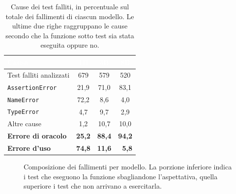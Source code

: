 \begin{table}[H]
\centering
\caption{Cause dei test falliti, in percentuale sul totale dei fallimenti di
ciascun modello. Le ultime due righe raggruppano le cause secondo che la
funzione sotto test sia stata eseguita oppure no.}
\label{tab:fallimenti}
\begin{tabular}{lccc}
\hline
\rowcolor{intest}
\textcolor{white}{\textbf{Causa}} & \textcolor{white}{\textbf{1B}} &
\textcolor{white}{\textbf{3B}} & \textcolor{white}{\textbf{8B}} \\
\hline
Test falliti analizzati & 679 & 579 & 520 \\
\hline
\texttt{AssertionError} & 21,9 & 71,0 & 83,1 \\
\texttt{NameError}      & 72,2 &  8,6 &  4,0 \\
\texttt{TypeError}      &  4,7 &  9,7 &  2,9 \\
Altre cause             &  1,2 & 10,7 & 10,0 \\
\hline
\rowcolor{accento}
\textbf{Errore di oracolo} & \textbf{25,2} & \textbf{88,4} & \textbf{94,2} \\
\rowcolor{secondario!25}
\textbf{Errore d'uso}      & \textbf{74,8} & \textbf{11,6} & \textbf{\ 5,8} \\
\hline
\end{tabular}
\end{table}

\begin{figure}[H]
\centering
{}
\caption{Composizione dei fallimenti per modello. La porzione inferiore indica
i test che eseguono la funzione sbagliandone l'aspettativa, quella superiore i
test che non arrivano a esercitarla.}
\label{fig:fallimenti}
\end{figure}


